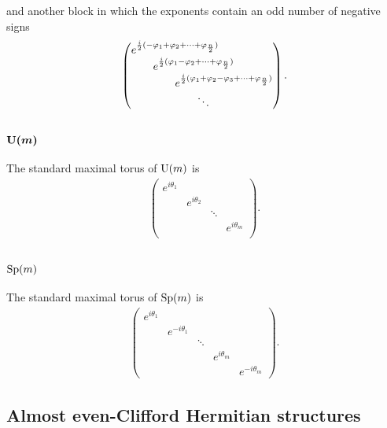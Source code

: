\documentclass[10pt,a4paper]{amsart}
\numberwithin{equation}{section}
\begin{document}
and another block in which the exponents contain an odd number of negative signs
\begin{gather*}
\left(\begin{array}{@{}l@{}}
e^{{i\over 2}(-\varphi_1+\varphi_2+\cdots+\varphi_{{n\over 2}})} \\
\qquad e^{{i\over 2}(\varphi_1-\varphi_2+\cdots+\varphi_{{n\over 2}})} \\
\qquad\qquad e^{{i\over 2}(\varphi_1+\varphi_2-\varphi_3+\cdots+\varphi_{{n\over 2}})} \\
\qquad\qquad\qquad \ddots
 \end{array}\right).
\end{gather*}

\subsubsection[${\rm U}(m)$]{$\boldsymbol{{\rm U}(m)}$}

The standard maximal torus of ${\rm U}(m)$ is
\begin{gather*}\left(
\begin{matrix}
e^{i\theta_1} & & & \\
 & e^{i\theta_2} & & \\
 & & \ddots & \\
 & & & e^{i\theta_m}\\
 & & &
\end{matrix}
\right).
\end{gather*}

\subsubsection{${\rm Sp}(m)$}

The standard maximal torus of ${\rm Sp}(m)$ is
\begin{gather*}\left(
\begin{matrix}
e^{i\theta_1} & & & & \\
 & e^{-i\theta_1} & & & \\
 & & \ddots & & \\
 & & & e^{i\theta_m} & \\
 & & & & e^{-i\theta_m}
\end{matrix}
\right).
\end{gather*}

\subsection{Almost even-Clif\/ford Hermitian structures}
\end{document}
